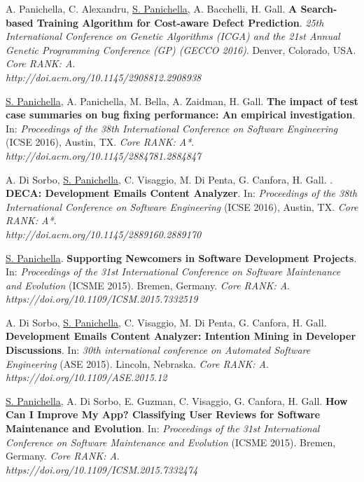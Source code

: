 \documentclass[10pt]{article}
\begin{document}
\begin{bibenum}
         \item  \label{C9}  A. Panichella, C. Alexandru,  \underline{S. Panichella}, A. Bacchelli, H. Gall. \textbf{A Search-based Training Algorithm for Cost-aware Defect Prediction}.  \emph{25th International Conference on Genetic Algorithms (ICGA) and the 21st Annual Genetic Programming Conference (GP) (GECCO 2016)}.  Denver, Colorado, USA.  \textit{Core RANK: A}. \\\textit{http://doi.acm.org/10.1145/2908812.2908938}
        
    \item  \label{C10}   \underline{S. Panichella}, A. Panichella, M. Bella, A. Zaidman, H. Gall. \textbf{The impact of test case summaries on bug fixing performance: An empirical investigation}. In: \emph{Proceedings of the 38th International Conference on Software Engineering} (ICSE 2016), Austin, TX.  \textit{Core RANK: A*}. \\\textit{http://doi.acm.org/10.1145/2884781.2884847}

    \item   \label{C11}   A. Di Sorbo, \underline{S. Panichella}, C. Visaggio, M. Di Penta, G. Canfora,  H. Gall. . \textbf{DECA: Development Emails Content Analyzer}. In: \emph{Proceedings of the 38th International Conference on Software Engineering} (ICSE 2016), Austin, TX.  \textit{Core RANK: A*}. \\\textit{http://doi.acm.org/10.1145/2889160.2889170}

    \item  \label{C12}   \underline{S. Panichella}. \textbf{Supporting Newcomers in Software Development Projects}. In: \emph{Proceedings of the 31st International Conference on Software Maintenance and Evolution} (ICSME 2015). Bremen, Germany.  \textit{Core RANK: A}. \\\textit{https://doi.org/10.1109/ICSM.2015.7332519}

        \item  \label{C13}  A. Di Sorbo, \underline{S. Panichella}, C. Visaggio, M. Di Penta, G. Canfora,  H. Gall. \textbf{Development Emails Content Analyzer: Intention Mining in Developer Discussions}. In: \emph{30th international conference on Automated Software Engineering} (ASE 2015).  Lincoln, Nebraska.  \textit{Core RANK: A}. \\\textit{https://doi.org/10.1109/ASE.2015.12}

    \item  \label{C14}   \underline{S. Panichella}, A. Di Sorbo, E. Guzman, C. Visaggio, G. Canfora, H. Gall. \textbf{How Can I Improve My App? Classifying User Reviews for Software Maintenance and Evolution}. In: \emph{Proceedings of the 31st International Conference on Software Maintenance and Evolution} (ICSME 2015). Bremen, Germany.  \textit{Core RANK: A}. \\\textit{https://doi.org/10.1109/ICSM.2015.7332474}


\end{bibenum}
\end{document}
